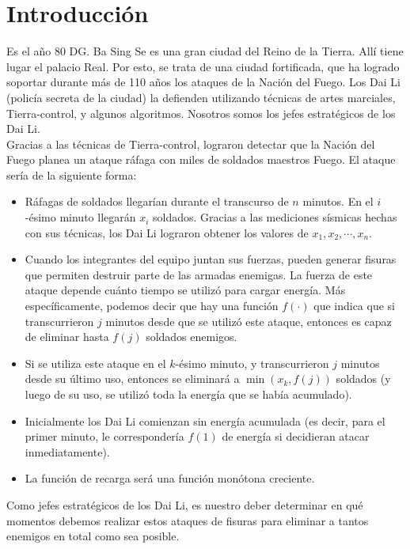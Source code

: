 \section{Introducción}

Es el año 80 DG. Ba Sing Se es una gran ciudad del Reino de la Tierra. Allí tiene lugar el palacio Real. Por esto, se trata de una ciudad fortificada, que ha logrado soportar durante más de 110 años los ataques de la Nación del Fuego. Los Dai Li (policía secreta de la ciudad) la defienden utilizando técnicas de artes marciales, Tierra-control, y algunos algoritmos. Nosotros somos los jefes estratégicos de los Dai Li.\\
Gracias a las técnicas de Tierra-control, lograron detectar que la Nación del Fuego planea un ataque ráfaga con miles de soldados maestros Fuego. El ataque sería de la siguiente forma:
\begin{itemize}
\item Ráfagas de soldados llegarían durante el transcurso de $n$ minutos. En el $i$-ésimo minuto llegarán $x_i$ soldados. Gracias a las mediciones sísmicas hechas con sus técnicas, los Dai Li lograron obtener los valores de $x_1, x_2, \cdots, x_n$.

\item Cuando los integrantes del equipo juntan sus fuerzas, pueden generar fisuras que permiten destruir parte de las armadas enemigas. La fuerza de este ataque depende cuánto tiempo se utilizó para cargar energía. Más específicamente, podemos decir que hay una función $f(\cdot)$ que indica que si transcurrieron $j$ minutos desde que se utilizó este ataque, entonces es capaz de eliminar hasta $f(j)$ soldados enemigos.

\item Si se utiliza este ataque en el $k$-ésimo minuto, y transcurrieron $j$ minutos desde su último uso, entonces se eliminará a $\min(x_k, f(j))$ soldados (y luego de su uso, se utilizó toda la energía que se había acumulado).

\item Inicialmente los Dai Li comienzan sin energía acumulada (es decir, para el primer minuto, le correspondería $f(1)$ de energía si decidieran atacar inmediatamente).

\item La función de recarga será una función monótona creciente.
\end{itemize}
Como jefes estratégicos de los Dai Li, es nuestro deber determinar en qué momentos debemos realizar estos ataques de fisuras para eliminar a tantos enemigos en total como sea posible.

